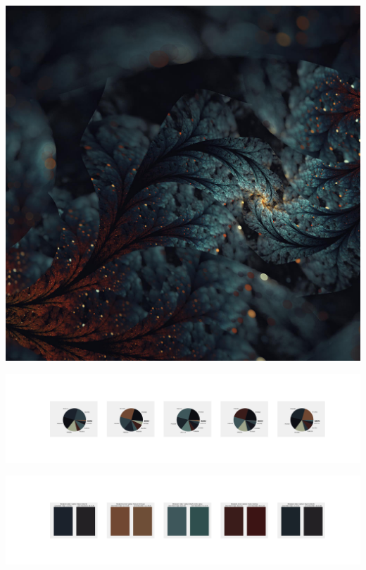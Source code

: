 \documentclass[11pt]{article}
\begin{document}
\begin{landscape}
    \begin{center}
    \includegraphics[width=\textwidth]{./nbimg/file (408).jpg}
    \end{center}

    \begin{center}
    \includegraphics[width=250mm]{./nbimg/pie-343.jpg}
    \end{center}

    \begin{center}
    \includegraphics[width=250mm]{./nbimg/peak-343.jpg}
    \end{center}
    


\end{landscape}
\end{document}
